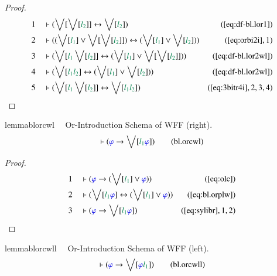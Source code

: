 \begin{proof}
\begin{align}
  1 &&  & \vdash ( \bigvee[ \bigvee[ \mwl{l_2} ] ] \leftrightarrow \bigvee[
      \mwl{l_2} ] )&(\mbox{\ref{eq:df-bl.lor1}})\notag
  \\ 2 &&  & \vdash ( ( \bigvee[ \mwl{l_1} ] \vee \bigvee[ \bigvee[ \mwl{l_2} ]
      ] ) \leftrightarrow ( \bigvee[ \mwl{l_1} ] \vee
      \bigvee[ \mwl{l_2} ] )
      )&(\mbox{\ref{eq:orbi2i}},1)\notag
  \\ 3 &&  & \vdash ( \bigvee[ \mwl{l_1} \bigvee[ \mwl{l_2} ] ] \leftrightarrow
      ( \bigvee[ \mwl{l_1} ] \vee \bigvee[ \bigvee[
      \mwl{l_2} ] ] )
      )&(\mbox{\ref{eq:df-bl.lor2wl}})\notag
  \\ 4 &&  & \vdash ( \bigvee[ \mwl{l_1} \mwl{l_2} ] \leftrightarrow ( \bigvee[
      \mwl{l_1} ] \vee \bigvee[ \mwl{l_2} ] )
      )&(\mbox{\ref{eq:df-bl.lor2wl}})\notag
  \\ 5 &&  & \vdash ( \bigvee[ \mwl{l_1} \bigvee[ \mwl{l_2} ] ] \leftrightarrow
      \bigvee[ \mwl{l_1} \mwl{l_2} ]
      )&(\mbox{\ref{eq:3bitr4i}},2,3,4)\notag
\end{align}
\end{proof}

\begin{restatable}{lemma}{blorcwl}~~ Or-Introduction Schema of WFF (right).
\begin{align}
\vdash ( \mw{\varphi} \rightarrow \bigvee[ \mwl{l_1} \mw{\varphi} ]
    )\label{eq:bl.orcwl}\tag{bl.orcwl}
\end{align}
\end{restatable}

\begin{proof}
\begin{align}
  1 &&  & \vdash ( \mw{\varphi} \rightarrow ( \bigvee[ \mwl{l_1} ] \vee
      \mw{\varphi} ) )&(\mbox{\ref{eq:olc}})\notag
  \\ 2 &&  & \vdash ( \bigvee[ \mwl{l_1} \mw{\varphi} ] \leftrightarrow (
      \bigvee[ \mwl{l_1} ] \vee \mw{\varphi} )
      )&(\mbox{\ref{eq:bl.orplw}})\notag
  \\ 3 &&  & \vdash ( \mw{\varphi} \rightarrow \bigvee[ \mwl{l_1} \mw{\varphi}
      ] )&(\mbox{\ref{eq:sylibr}},1,2)\notag
\end{align}
\end{proof}

\begin{restatable}{lemma}{blorcwll}~~ Or-Introduction Schema of WFF (left).
\begin{align}
\vdash ( \mw{\varphi} \rightarrow \bigvee[ \mw{\varphi} \mwl{l_1} ]
    )\label{eq:bl.orcwll}\tag{bl.orcwll}
\end{align}
\end{restatable}

